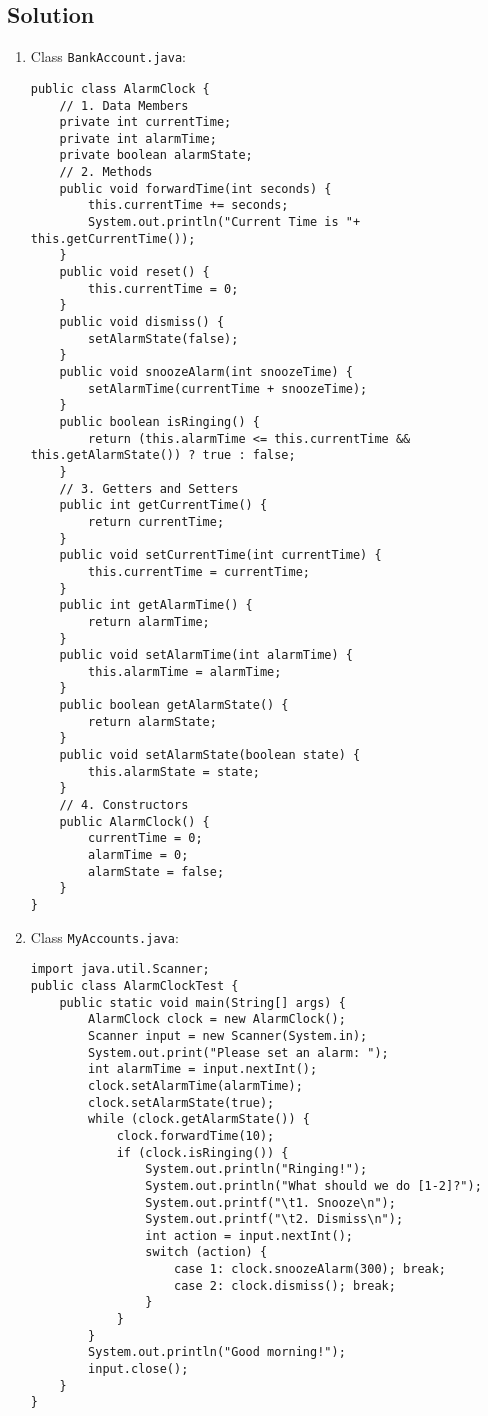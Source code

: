 \subsection*{Solution}
\begin{enumerate}
\item Class \texttt{BankAccount.java}:
\lstset{language=java}
\begin{lstlisting}
public class AlarmClock {
	// 1. Data Members
	private int currentTime;
	private int alarmTime;
	private boolean alarmState;
	// 2. Methods
	public void forwardTime(int seconds) {
		this.currentTime += seconds;
		System.out.println("Current Time is "+ this.getCurrentTime());
	}
	public void reset() {
		this.currentTime = 0;
	}
	public void dismiss() {
		setAlarmState(false);
	}
	public void snoozeAlarm(int snoozeTime) {
		setAlarmTime(currentTime + snoozeTime);
	}
	public boolean isRinging() {
		return (this.alarmTime <= this.currentTime && this.getAlarmState()) ? true : false;
	}
	// 3. Getters and Setters
	public int getCurrentTime() {
		return currentTime;
	}
	public void setCurrentTime(int currentTime) {
		this.currentTime = currentTime;
	}
	public int getAlarmTime() {
		return alarmTime;
	}
	public void setAlarmTime(int alarmTime) {
		this.alarmTime = alarmTime;
	}
	public boolean getAlarmState() {
		return alarmState;
	}
	public void setAlarmState(boolean state) {
		this.alarmState = state;
	}
	// 4. Constructors
	public AlarmClock() {
		currentTime = 0;
		alarmTime = 0;
		alarmState = false;
	}
}
\end{lstlisting}
\item Class \texttt{MyAccounts.java}:
\lstset{language=java}
\begin{lstlisting}
import java.util.Scanner;
public class AlarmClockTest {
	public static void main(String[] args) {
		AlarmClock clock = new AlarmClock();
		Scanner input = new Scanner(System.in);
		System.out.print("Please set an alarm: ");
		int alarmTime = input.nextInt();
		clock.setAlarmTime(alarmTime);
		clock.setAlarmState(true);
		while (clock.getAlarmState()) {
			clock.forwardTime(10);
			if (clock.isRinging()) {
				System.out.println("Ringing!");
				System.out.println("What should we do [1-2]?");
				System.out.printf("\t1. Snooze\n");
				System.out.printf("\t2. Dismiss\n");
				int action = input.nextInt();
				switch (action) {
					case 1: clock.snoozeAlarm(300); break;
					case 2: clock.dismiss(); break;
				}
			}
		}
		System.out.println("Good morning!");
		input.close();
	}
}
\end{lstlisting}
\end{enumerate}

